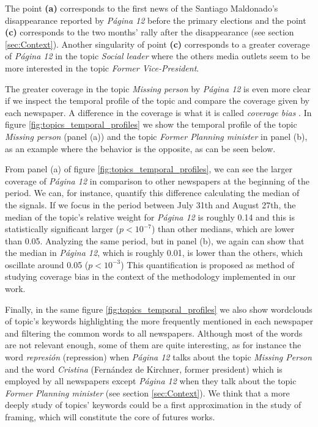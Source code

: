 \documentclass{bmcart}
\begin{document}
\par The point \textbf{(a)} corresponds  to the first news of the Santiago Maldonado's disappearance  reported by \emph{P\'agina 12} before the primary elections and the point \textbf{(c)} corresponds to  the two months' rally after the disappearance  (see section \ref{sec:Context}). Another singularity of point \textbf{(c)} corresponds to a greater coverage of \emph{P\'agina 12} in the topic \emph{Social leader} where the others media outlets seem to be more interested in the topic \emph{Former Vice-President}.

\par The greater coverage in the topic \emph{Missing person} by \emph{P\'agina 12} is even more clear if we inspect the temporal profile of the topic and compare the coverage given by each newspaper. A difference in the coverage is what it is called \emph{coverage bias} \cite{dallmann2015media}.  In figure \ref{fig:topics_temporal_profiles} we show the temporal profile of the topic \emph{Missing person} (panel (a)) and the topic \emph{Former Planning minister} in panel (b), as an example where the behavior is the opposite, as can be seen below.

\par From panel (a) of figure \ref{fig:topics_temporal_profiles}, we can see the larger coverage of \emph{P\'agina 12} in comparison to other newspapers at the beginning of the period. We can, for instance, quantify this difference calculating  the median of the signals. If we focus in the period between July 31th and August 27th, the median of the topic's relative weight for \emph{P\'agina 12} is roughly 0.14 and this is statistically significant larger ($p < 10^{-7}$) than other medians, which are lower than 0.05.
Analyzing the same period, but in panel (b), we again can show that the median in \emph{P\'agina 12}, which is roughly 0.01, is lower than the others, which oscillate around 0.05 ($p<10^{-3}$)
This quantification is proposed as method of studying coverage bias in the context of the methodology implemented in our work. 

\par Finally, in the same figure \ref{fig:topics_temporal_profiles} we also show wordclouds of topic's keywords highlighting the more frequently mentioned in each newspaper and filtering the common words to all newspapers.
Although most of the words are not relevant enough, some of them are quite interesting, as for instance the word \emph{represi\'on} (repression) when \emph{P\'agina 12} talks about the topic \emph{Missing Person} and the word \emph{Cristina} (Fern\'andez de Kirchner, former president) which is employed by all newspapers except \emph{P\'agina 12} when they  talk about the topic \emph{Former Planning minister} (see section \ref{sec:Context}).
We think that a more deeply study of topics' keywords could be a first approximation in the study of framing, which will constitute the core of futures works.
\end{document}
